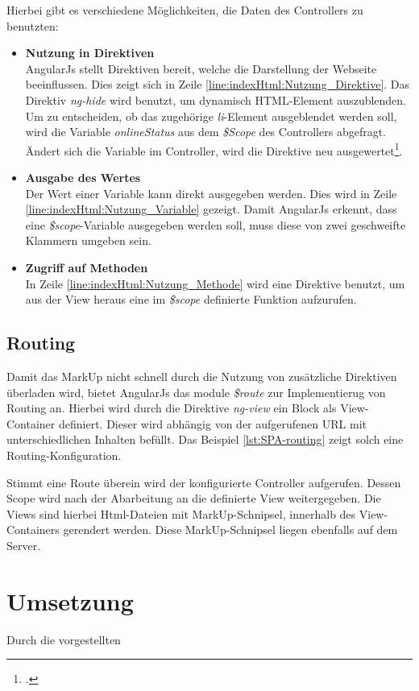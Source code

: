 Hierbei gibt es verschiedene Möglichkeiten, die Daten des Controllers zu benutzten: 
\begin{itemize}
\item \textbf{Nutzung in Direktiven}\\
AngularJs stellt Direktiven bereit, welche die Darstellung der Webseite beeinflussen. Dies zeigt sich in Zeile \ref{line:indexHtml:Nutzung_Direktive}. Das Direktiv \textit{ng-hide} wird benutzt, um dynamisch HTML-Element auszublenden. Um zu entscheiden, ob das zugehörige \textit{li}-Element ausgeblendet werden soll, wird die Variable \textit{onlineStatus} aus dem \textit{\$Scope} des Controllers abgefragt. Ändert sich die Variable im Controller, wird die Direktive neu ausgewertet\footcite{online:angular:diretive}.
\item \textbf{Ausgabe des Wertes}\\
Der Wert einer Variable kann direkt ausgegeben werden. Dies wird in Zeile \ref{line:indexHtml:Nutzung_Variable} gezeigt. Damit AngularJs erkennt, dass eine \textit{\$scope}-Variable ausgegeben werden soll, muss diese von zwei geschweifte Klammern umgeben sein.
\item \textbf{Zugriff auf Methoden}\\
In Zeile \ref{line:indexHtml:Nutzung_Methode} wird eine Direktive benutzt, um aus der View heraus eine im \textit{\$scope} definierte Funktion aufzurufen.
\end{itemize}
\subsection{Routing}
\label{ssec:SPA-Routing}
Damit das MarkUp nicht schnell durch die Nutzung von zusätzliche Direktiven überladen wird, bietet AngularJs das module \textit{\$route} zur Implementierug von Routing an. Hierbei wird durch die Direktive \textit{ng-view} ein Block als View-Container definiert. Dieser wird abhängig von der aufgerufenen URL mit unterschiedlichen Inhalten befüllt. Das Beispiel \ref{lst:SPA-routing} zeigt solch eine Routing-Konfiguration. 

Stimmt eine Route überein wird der konfigurierte Controller aufgerufen. Dessen Scope wird nach der Abarbeitung an die definierte View weitergegeben. Die Views sind hierbei Html-Dateien mit MarkUp-Schnipsel, innerhalb des View-Containers gerendert werden. Diese MarkUp-Schnipsel liegen ebenfalls auf dem Server. 
\section{Umsetzung}
\label{sec:SPA-Umsetzung}
Durch die vorgestellten
